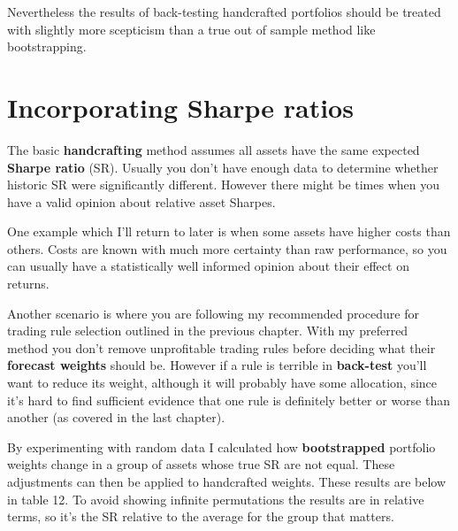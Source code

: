 Nevertheless the results of back-testing handcrafted portfolios should be treated with slightly more scepticism than a true out of sample method like bootstrapping.

\section*{Incorporating Sharpe ratios}  {}

The basic \textbf{handcrafting} method assumes all assets have the same expected \textbf{Sharpe ratio} (SR). Usually you don't have enough data to determine whether historic SR were significantly different. However there might be times when you have a valid opinion about relative asset Sharpes.

One example which I'll return to later is when some assets have higher costs than others. Costs are known with much more certainty than raw performance, so you can usually have a statistically well informed opinion about their effect on returns.

Another scenario is where you are following my recommended procedure for trading rule selection outlined in the previous chapter. With my preferred method you don't remove unprofitable trading rules before deciding what their \textbf{forecast weights} should be. However if a rule is terrible in \textbf{back-test} you'll want to reduce its weight, although it will probably have some allocation, since it's hard to find sufficient evidence that one rule is definitely better or worse than another (as covered in the last chapter).

By experimenting with random data I calculated how \textbf{bootstrapped} portfolio weights change in a group of assets whose true SR are not equal. These adjustments can then be applied to handcrafted weights. These results are below in table 12. To avoid showing infinite permutations the results are in relative terms, so it's the SR relative to the average for the group that matters.

